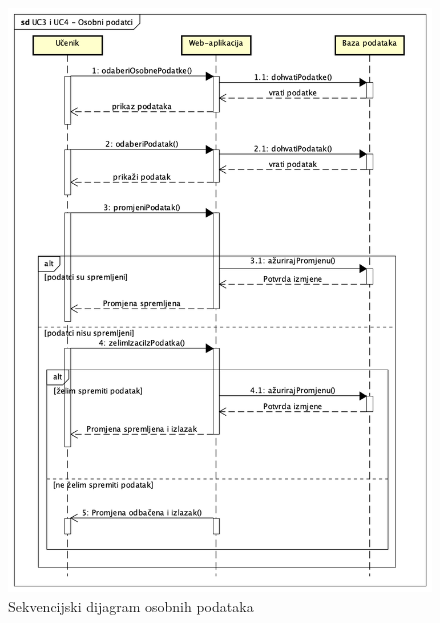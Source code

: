                     \begin{figure}[H]
                        \includegraphics[width=\textwidth]{dijagrami/sdiag1.png}
                        \caption{Sekvencijski dijagram osobnih podataka}
                        \label{fig:sdiag1}
                    \end{figure}

                \eject

